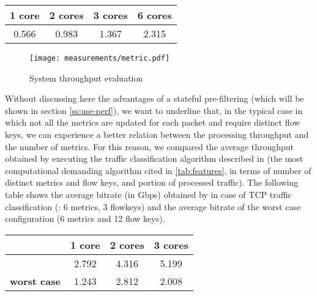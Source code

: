\documentclass[conference,letterpaper]{sig-alternate-10pt}
\begin{document}
\begin{center}
\begin{footnotesize}
\begin{tabular}{ | c | c | c | c |}
\hline
\textbf{1 core} & \textbf{2 cores} & \textbf{3 cores} & \textbf{6 cores}\\
\hline
0.566 & 0.983 & 1.367 & 2.315 \\
\hline
\end{tabular}
\end{footnotesize}
\end{center}

\begin{figure}[!t]
\centering
\texttt{[image: measurements/metric.pdf]}
\caption{System throughput evaluation}
\label{fig:metric-measurement}
\end{figure}

Without discussing here the advantages of a stateful pre-filtering (which will be shown in section \ref{ss:use-perf}), we want to underline that, in the typical case in which not all the metrics are updated for each packet and require distinct flow keys, we can experience a better relation between the processing throughput and the number of metrics. For this reason, we compared the average throughput obtained by executing the traffic classification algorithm described in \cite{complex} (the most computational demanding algorithm cited in \ref{tab:features}, in terms of number of distinct metrics and flow keys, and portion of processed traffic). The following table shows the average bitrate (in Gbps) obtained by \cite{complex} in case of TCP traffic classification (\cite{complex}: 6 metrics, 3 flowkeys) and the average bitrate of the worst case configuration (6 metrics and 12 flow keys). 

\begin{center}
\begin{footnotesize}
\begin{tabular}{ | c | c | c | c| }
\hline
& \textbf{1 core} & \textbf{2 cores} & \textbf{3 cores} \\
\hline
\textbf{\cite{complex}} & 2.792  & 4.316 & 5.199 \\
\hline
\textbf{worst case} & 1.243 & 2.812 & 2.008 \\
\hline
\end{tabular}
\end{footnotesize}
\end{center}
\end{document}
